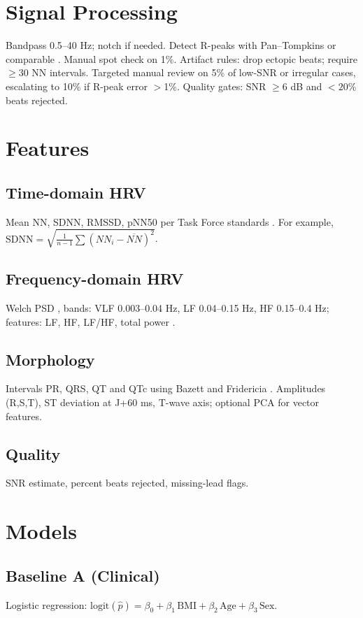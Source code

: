 \documentclass[11pt]{article}
\begin{document}
\section{Signal Processing}
Bandpass 0.5--40 Hz; notch if needed. Detect R-peaks with Pan--Tompkins or comparable \citep{pan1985real}. Manual spot check on 1\%. Artifact rules: drop ectopic beats; require $\geq$30 NN intervals. Targeted manual review on 5\% of low-SNR or irregular cases, escalating to 10\% if R-peak error $>$1\%. Quality gates: SNR $\geq$6 dB and $<20\%$ beats rejected.

\section{Features}
\subsection{Time-domain HRV}
Mean NN, SDNN, RMSSD, pNN50 per Task Force standards \citep{taskforce1996hrv}. For example, $\mathrm{SDNN}=\sqrt{\tfrac{1}{n-1}\sum (NN_i-\overline{NN})^2}$.
\subsection{Frequency-domain HRV}
Welch PSD \citep{welch1967}, bands: VLF 0.003--0.04 Hz, LF 0.04--0.15 Hz, HF 0.15--0.4 Hz; features: LF, HF, LF/HF, total power \citep{taskforce1996hrv}.
\subsection{Morphology}
Intervals PR, QRS, QT and QTc using Bazett and Fridericia \citep{bazett1920interval,fridericia1920systole}. Amplitudes (R,S,T), ST deviation at J+60 ms, T-wave axis; optional PCA for vector features.
\subsection{Quality}
SNR estimate, percent beats rejected, missing-lead flags.

\section{Models}
\subsection{Baseline A (Clinical)}
Logistic regression: $\mathrm{logit}(\hat p)=\beta_0+\beta_1\,\mathrm{BMI}+\beta_2\,\mathrm{Age}+\beta_3\,\mathrm{Sex}$.
\end{document}
